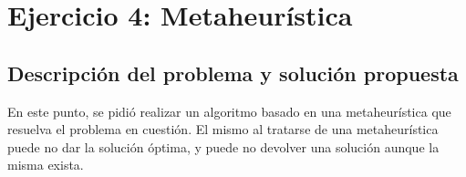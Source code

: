 \section{Ejercicio 4: Metaheurística}


    \subsection{Descripción del problema y solución propuesta}
        En este punto, se pidió realizar un algoritmo basado en una metaheurística que resuelva el problema en cuestión. El mismo al tratarse de una metaheurística puede no dar la solución óptima, y puede no devolver una solución aunque la misma exista.

